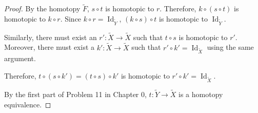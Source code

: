 \documentclass[12pt, psamsfonts]{amsart}
\theoremstyle{definition}
\theoremstyle{remark}
\DeclareMathOperator{\Id}{Id}
\numberwithin{equation}{section}
\begin{document}
\begin{proof}
  By the homotopy $\tilde{F}$, $s \circ t$ is homotopic to $r$.
  Therefore, $k \circ (s \circ t)$ is homotopic to $k \circ r$.
  Since $k \circ r = \Id_{\tilde{Y}}$, $(k \circ s) \circ t$ is homotopic to $\Id_{\tilde{Y}}$.

  Similarly, there must exist an $r': \tilde{X} \rightarrow \tilde{X}$ such that $t \circ s$ is homotopic to $r'$.
  Moreover, there must exist a $k': \tilde{X} \rightarrow \tilde{X}$ such that $r' \circ k' = \Id_{\tilde{X}}$ using the same argument.

  Therefore, $t \circ (s \circ k') = (t \circ s) \circ k'$ is homotopic to $r' \circ k' = \Id_{\tilde{X}}$.

  By the first part of Problem 11 in Chapter 0, $t: \tilde{Y} \rightarrow \tilde{X}$ is a homotopy equivalence.
\end{proof}
\end{document}
